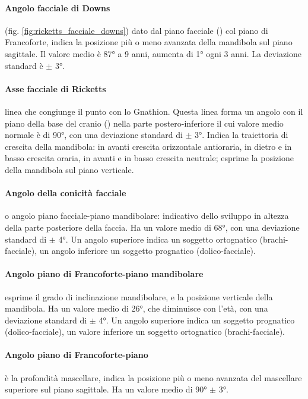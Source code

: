 \paragraph{Angolo facciale di Downs} (fig. \ref{fig:ricketts_facciale_downs}) dato dal piano facciale () col piano di Francoforte, indica la posizione più o meno avanzata della mandibola sul piano sagittale. Il valore medio è 87° a 9 anni, aumenta di 1° ogni 3 anni. La deviazione standard è $\pm$ 3°.

\paragraph{Asse facciale di Ricketts} linea che congiunge il punto  con lo Gnathion. Questa linea forma un angolo con il piano della base del cranio () nella parte postero-inferiore il cui valore medio normale è di 90°, con una deviazione standard di $\pm$ 3°. Indica la traiettoria di crescita della mandibola: in avanti crescita orizzontale antioraria, in dietro e in basso crescita oraria, in avanti e in basso crescita neutrale; esprime la posizione della mandibola sul piano verticale.

\paragraph{Angolo della conicità facciale} o angolo piano facciale-piano mandibolare: indicativo dello sviluppo in altezza della parte posteriore della faccia. Ha un valore medio di 68°, con una deviazione standard di $\pm$ 4°. Un angolo superiore indica un soggetto ortognatico (brachi-facciale), un angolo inferiore un soggetto prognatico (dolico-facciale).

\paragraph{Angolo piano di Francoforte-piano mandibolare} esprime il grado di inclinazione mandibolare, e la posizione verticale della mandibola. Ha un valore medio di 26°, che diminuisce con l'età, con una deviazione standard di $\pm$ 4°. Un angolo superiore indica un soggetto prognatico (dolico-facciale), un valore inferiore un soggetto ortognatico (brachi-facciale).

\paragraph{Angolo piano di Francoforte-piano } è la profondità mascellare, indica la posizione più o meno avanzata del mascellare superiore sul piano sagittale. Ha un valore medio di 90° $\pm$ 3°.

